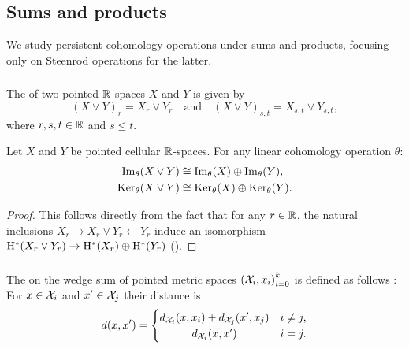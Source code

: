
\subsection{Sums and products}\label{ss:sums_products}

We study persistent cohomology operations under sums and products, focusing only on Steenrod operations for the latter.

\subsubsection{}\label{ss:wedge_sum_general}

The  of two pointed \(\mathbb{R}\)-spaces \(X\) and \(Y\) is given by
\[
(X \vee Y)_r = X_r \vee Y_r \quad\text{and}\quad (X \vee Y)_{s,t} = X_{s,t} \vee Y_{s,t},
\]
where \(r, s, t \in \mathbb{R}\) and \(s \leq t\).

\lemma
Let $X$ and $Y$ be pointed cellular $\mathbb{R}$-spaces.
For any linear cohomology operation $\theta$:
\begin{align*}
	\operatorname{Im}_\theta(X \vee Y) &\cong \operatorname{Im}_\theta(X) \oplus \operatorname{Im}_\theta(Y), \\
	\operatorname{Ker}_\theta(X \vee Y) &\cong \operatorname{Ker}_\theta(X) \oplus \operatorname{Ker}_\theta(Y).
\end{align*}

\begin{proof}
	This follows directly from the fact that for any \(r \in \mathbb{R}\), the natural inclusions $X_r \to X_r \vee Y_r \leftarrow Y_r$ induce an isomorphism $\mathrm{H}^*(X_r \vee Y_r) \to \mathrm{H}^*(X_r) \oplus \mathrm{H}^*(Y_r)$ (\cite[Cor.~2.25.]{hatcher2000}).
\end{proof}

\subsubsection{}\label{ss:wedge sum}

The  on the wedge sum of pointed metric spaces ${(\mathcal{X}_i, x_i)}_{i = 0}^k$ is defined as follows \cite{burago2001course}: For $x \in \mathcal{X}_i$ and $x' \in \mathcal{X}_j$ their distance is
\[
d(x, x') =
\begin{cases}
	d_{\cX_i}(x, x_i) + d_{\cX_j}(x', x_j) & i \neq j, \\
	\hfil d_{\cX_i}(x, x') & i = j.
\end{cases}
\]

